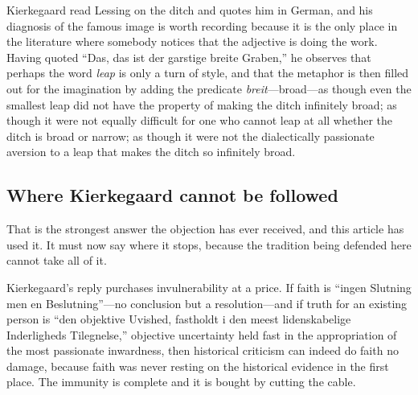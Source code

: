 Kierkegaard read Lessing on the ditch and quotes him in German, and his diagnosis of the famous image is worth recording because it is the only place in the literature where somebody notices that the adjective is doing the work. Having quoted ``Das, das ist der garstige breite Graben,'' he observes that perhaps the word \emph{leap} is only a turn of style, and that the metaphor is then filled out for the imagination by adding the predicate \emph{breit}---broad---as though even the smallest leap did not have the property of making the ditch infinitely broad; as though it were not equally difficult for one who cannot leap at all whether the ditch is broad or narrow; as though it were not the dialectically passionate aversion to a leap that makes the ditch so infinitely broad.

\subsection{Where Kierkegaard cannot be followed}

That is the strongest answer the objection has ever received, and this article has used it. It must now say where it stops, because the tradition being defended here cannot take all of it.

Kierkegaard's reply purchases invulnerability at a price. If faith is ``ingen Slutning men en Beslutning''---no conclusion but a resolution---and if truth for an existing person is ``den objektive Uvished, fastholdt i den meest lidenskabelige Inderligheds Tilegnelse,'' objective uncertainty held fast in the appropriation of the most passionate inwardness, then historical criticism can indeed do faith no damage, because faith was never resting on the historical evidence in the first place. The immunity is complete and it is bought by cutting the cable.


